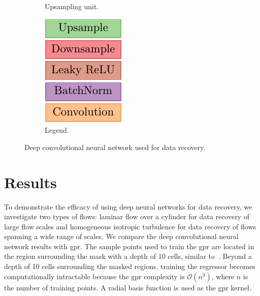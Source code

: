 \documentclass[review]{elsarticle}
\begin{document}
\begin{figure}[!tbp]
\begin{subfigure}[b]{0.33\textwidth}
    \caption{Upsampling unit.}\label{fig:upsample}%
  \end{subfigure}%
  \hfill%
  \begin{subfigure}[b]{0.15\textwidth}%
    \includegraphics[width=\textwidth]{./figs/legend.pdf}%
    \vspace*{0.4cm}%
    \caption{Legend.}\label{fig:legend}%
  \end{subfigure}%
  \caption{Deep convolutional neural network used for data recovery.}\label{fig:arch}%
\end{figure}%

\section{Results}\label{sec:results}

To demonstrate the efficacy of using deep neural networks for data
recovery, we investigate two types of flows: laminar flow over a
cylinder for data recovery of large flow scales and homogeneous
isotropic turbulence for data recovery of flows spanning a wide range
of scales. We compare the deep convolutional neural network results
with \gls{gpr}. The sample points used to train the \gls{gpr} are
located in the region surrounding the mask with a depth of 10 cells,
similar to~\cite{Lee2015}. Beyond a depth of 10 cells surrounding
the masked regions, training the regressor becomes computationally
intractable because the \gls{gpr} complexity is $\mathcal{O}(n^3)$, where
$n$ is the number of training points. A radial basis function is used
as the \gls{gpr} kernel.
\end{document}
